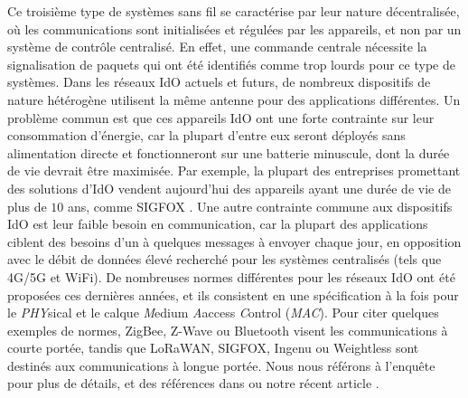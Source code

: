 \begin{resume_fr}
Ce troisième type de systèmes sans fil se caractérise par leur nature décentralisée,
où les communications sont initialisées et régulées par les appareils, et non par un système de contrôle centralisé.
%
En effet, une commande centrale nécessite la signalisation de paquets qui ont été identifiés comme trop lourds pour ce type de systèmes.
Dans les réseaux IdO actuels et futurs, de nombreux dispositifs de nature hétérogène utilisent la même antenne pour des applications différentes.
Un problème commun est que ces appareils IdO ont une forte contrainte sur leur consommation d'énergie, car la plupart d'entre eux seront déployés sans alimentation directe et fonctionneront sur une batterie minuscule, dont la durée de vie devrait être maximisée.
Par exemple, la plupart des entreprises promettant des solutions d'IdO vendent aujourd'hui des appareils ayant une durée de vie de plus de $10$ ans, comme SIGFOX \cite{Centenaro16}.
Une autre contrainte commune aux dispositifs IdO est leur faible besoin en communication, car la plupart des applications ciblent des besoins d'un à quelques messages à envoyer chaque jour, en opposition avec le débit de données élevé recherché pour les systèmes centralisés (tels que 4G/5G et WiFi).
%
De nombreuses normes différentes pour les réseaux IdO ont été proposées ces dernières années,
et ils consistent en une spécification à la fois pour le \emph{PHY}sical
et le calque \emph{M}edium \emph{A}access \emph{C}ontrol (\emph{MAC}).
Pour citer quelques exemples de normes, ZigBee, Z-Wave ou Bluetooth visent les communications à courte portée, tandis que LoRaWAN, SIGFOX, Ingenu ou Weightless sont destinés aux communications à longue portée.
Nous nous référons à l'enquête \cite{Centenaro16} pour plus de détails, et des références dans \cite{Azari18} ou notre récent article \cite{MoyBesson2019}.



\end{resume_fr}
